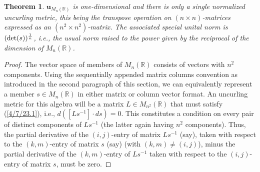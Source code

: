 \documentclass{amsart}
\numberwithin{equation}{section}
\newtheorem{theorem}{Theorem}
\theoremstyle{definition}
\numberwithin{theorem}{section}
\begin{document}
 
 \begin{theorem} \label{4/8/22.1} $\mathbf{u}_{M_n(\mathbb{R})}$ is one-dimensional and there is only a single normalized uncurling metric, this being the  transpose operation on $(n\times n)$-matrices expressed as an $(n^2\times n^2)$-matrix. The associated special unital norm is $({\rm det}(s))^{\frac{1}{n}}$, i.e., the usual norm raised to the power given by the reciprocal of the dimension of $M_n(\mathbb{R})$. \end{theorem}
 \begin{proof} The vector space of members of $ M_n(\mathbb{R})$ consists of  vectors with $n^2$ components.   Using the sequentially appended matrix columns convention as introduced in the second paragraph of this section, we can equivalently represent a member $s\in M_n(\mathbb{R})$ in either matrix or column vector format.   An uncurling metric for this algebra will be a matrix $L\in M_{n^2}(\mathbb{R})$ that must satisfy (\ref{4/7/23.1}), i.e., $d\left([Ls^{-1}]\cdot ds\right)=0$. This constitutes a condition on every pair of distinct components of $Ls^{-1}$ (the latter again having $n^2$ components).  Thus,  the partial derivative of the  $(i,j)$-entry of matrix $Ls^{-1}$ (say), taken with respect to the $(k,m)$-entry of matrix $s$ (say) (with $(k,m)\ne (i,j)$),  minus  the partial derivative of the $(k,m)$-entry of $Ls^{-1}$  taken with respect to the $(i,j)$-entry of matrix $s$, must be zero.
 

\end{proof}
\end{document}
